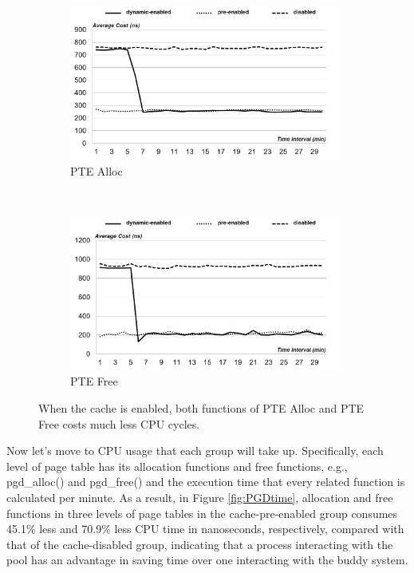 \begin{figure}[t!]
    \centering
    \begin{subfigure}[t]{0.5\textwidth}
        \centering
        \includegraphics[height=2.0in]{image/micro/PTEalloc.png}
        \caption{PTE Alloc}
        \label{fig:subfig:a}
    \end{subfigure}%
    ~
    \begin{subfigure}[t]{0.5\textwidth}
        \centering
        \includegraphics[height=2.0in]{image/micro/PTEfree.png}
        \caption{PTE Free}
        \label{fig:subfig:b}
    \end{subfigure}
    \caption{When the cache is enabled, both functions of PTE Alloc and PTE Free costs much less CPU cycles.}
    \label{fig:PTEtime}
\end{figure}


Now let’s move to CPU usage that each group will take up. Specifically, each level of page table has its allocation functions and free functions, e.g., pgd\_alloc() and pgd\_free() and the execution time that every related function is calculated per minute. As a result, in Figure \ref{fig:PGDtime}, allocation and free functions in three levels of page tables in the cache-pre-enabled group consumes 45.1\% less and 70.9\% less CPU time in nanoseconds, respectively, compared with that of the cache-disabled group, indicating that a process interacting with the pool has an advantage in saving time over one interacting with the buddy system.

